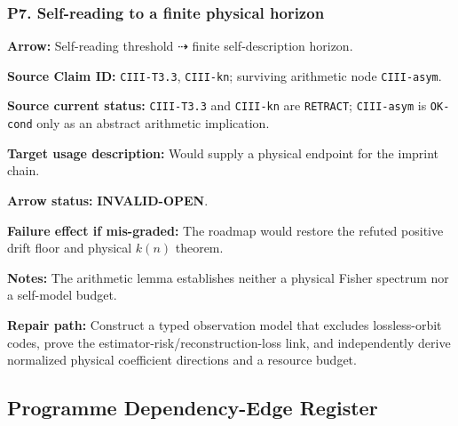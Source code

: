 \documentclass[12pt,a4paper]{article}
\begin{document}
\subsubsection*{P7. Self-reading to a finite physical horizon}
\noindent\textbf{Arrow:} Self-reading threshold
\(\dashrightarrow\) finite self-description horizon.\par
\noindent\textbf{Source Claim ID:} \texttt{CIII-T3.3},
\texttt{CIII-kn}; surviving arithmetic node \texttt{CIII-asym}.\par
\noindent\textbf{Source current status:} \texttt{CIII-T3.3} and
\texttt{CIII-kn} are \texttt{RETRACT}; \texttt{CIII-asym} is
\texttt{OK-cond} only as an abstract arithmetic implication.\par
\noindent\textbf{Target usage description:} Would supply a physical
endpoint for the imprint chain.\par
\noindent\textbf{Arrow status:} \textbf{INVALID-OPEN}.\par
\noindent\textbf{Failure effect if mis-graded:} The roadmap would restore
the refuted positive drift floor and physical \(k(n)\) theorem.\par
\noindent\textbf{Notes:} The arithmetic lemma establishes neither a
physical Fisher spectrum nor a self-model budget.\par
\noindent\textbf{Repair path:} Construct a typed observation model that
excludes lossless-orbit codes, prove the estimator-risk/reconstruction-loss
link, and independently derive normalized physical coefficient
directions and a resource budget.\par

\subsection{Programme Dependency-Edge Register}
\end{document}

